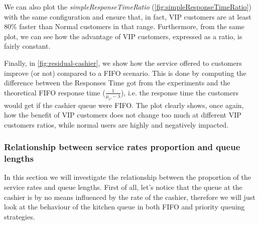 We can also plot the \emph{simpleResponseTimeRatio} (\cref{fig:simpleResponseTimeRatio}) with the same configuration and ensure that, in fact, VIP customers are at least 80\% faster than Normal customers in that range. Furthermore, from the same plot, we can see how the advantage of VIP customers, expressed as a ratio, is fairly constant.

Finally, in \cref{fig:residual-cashier}, we show how the service offered to customers improve (or not) compared to a FIFO scenario. This is done by computing the difference between the Responses Time got from the experiments and the theoretical FIFO response time ($\frac{1}{\mu_C-\lambda}$), i.e. the response time the customers would get if the cashier queue were FIFO. The plot clearly shows, once again, how the benefit of VIP customers does not change too much at different VIP customers ratios, while normal users are highly and negatively impacted.

\subsubsection{Relationship between service rates proportion and queue lengths}
\label{sec:cashier_no_infl}

In this section we will investigate the relationship between the proportion of the service rates and queue lengths. First of all, let's notice that the queue at the cashier is by no means influenced by the rate of the cashier, therefore we will just look at the behaviour of the kitchen queue in both FIFO and priority queuing strategies.

